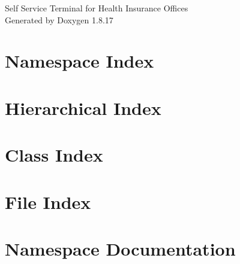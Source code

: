 \let\mypdfximage\pdfximage\def\pdfximage{\immediate\mypdfximage}\documentclass[twoside]{book}
\newcommand{\+}{\discretionary{\mbox{\scriptsize$\hookleftarrow$}}{}{}}
\newcommand{\clearemptydoublepage}{%
  \newpage{\pagestyle{empty}\cleardoublepage}%
}
\begin{document}
\hypersetup{pageanchor=false,
             bookmarksnumbered=true,
             pdfencoding=unicode
            }
\begin{titlepage}
\vspace*{7cm}
\begin{center}%
{\Large Self Service Terminal for Health Insurance Offices }\\
\vspace*{1cm}
{\large Generated by Doxygen 1.8.17}\\
\end{center}
\end{titlepage}
\clearemptydoublepage
{}
\tableofcontents
\clearemptydoublepage
{}
\hypersetup{pageanchor=true}

\chapter{Namespace Index}

\chapter{Hierarchical Index}

\chapter{Class Index}

\chapter{File Index}

\chapter{Namespace Documentation}






















\end{document}
